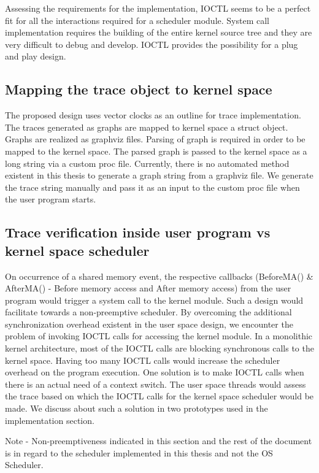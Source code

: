 Assessing the requirements for the implementation, IOCTL seems to be a perfect fit for all the interactions required for a scheduler module. 
System call implementation requires the building of the entire kernel source tree and they are very difficult to debug and develop. 
IOCTL provides the possibility for a plug and play design.

\subsection{Mapping the trace object to kernel space}

The proposed design uses vector clocks as an outline for trace implementation. 
The traces generated as graphs are mapped to kernel space a struct object. 
Graphs are realized as graphviz files. 
Parsing of graph is required in order to be mapped to the kernel space. 
The parsed graph is passed to the kernel space as a long string via a custom proc file. 
Currently, there is no automated method existent in this thesis to generate a graph string from a graphviz file. 
We generate the trace string manually and pass it as an input to the custom proc file when the user program starts.

\subsection{Trace verification inside user program vs kernel space scheduler}

On occurrence of a shared memory event, the respective callbacks (BeforeMA() \& AfterMA() - Before memory access and After memory access) from the user program would trigger a system call to the kernel module. 
Such a design would facilitate towards a non-preemptive scheduler. 
By overcoming the additional synchronization overhead existent in the user space design, we encounter the problem of invoking IOCTL calls  for accessing the kernel module. 
In a monolithic kernel architecture, most of the IOCTL calls are blocking synchronous calls to the kernel space. 
Having too many IOCTL calls would increase the scheduler overhead on the program execution. 
One solution is to make IOCTL calls when there is an actual need of a  context switch. 
The user space threads would assess the trace based on which the IOCTL calls for the kernel space scheduler would be made. 
We discuss about such a solution in two prototypes used in the implementation section.

Note - Non-preemptiveness indicated in this section and the rest of the document is in regard to the scheduler implemented in this thesis and not the OS Scheduler.


